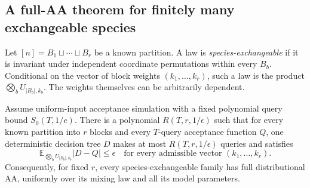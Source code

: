 \subsection{A full-AA theorem for finitely many exchangeable species}
\label{threshold_physics:species}

Let \([n]=B_1\sqcup\cdots\sqcup B_r\) be a known partition. A law is
\emph{species-exchangeable} if it is invariant under independent
coordinate permutations within every \(B_b\). Conditional on the vector
of block weights \((k_1,\ldots,k_r)\), such a law is the product
\(\bigotimes_b U_{|B_b|,k_b}\). The weights themselves can be arbitrarily
dependent.

\begin{theorem}
\label{thm:species_simulation}
Assume uniform-input acceptance simulation with a fixed polynomial query
bound \(S_0(T,1/e)\). There is a polynomial \(R(T,r,1/\epsilon)\) such
that for every known partition into \(r\) blocks and every \(T\)-query
acceptance function \(Q\), one deterministic decision tree \(D\) makes
at most \(R(T,r,1/\epsilon)\) queries and satisfies
\[
 \mathbb E_{\bigotimes_b U_{|B_b|,k_b}}|D-Q|\le\epsilon
 \quad\text{for every admissible vector }(k_1,\ldots,k_r).
\]
Consequently, for fixed \(r\), every species-exchangeable family has
full distributional AA, uniformly over its mixing law and all its model
parameters.
\end{theorem}

